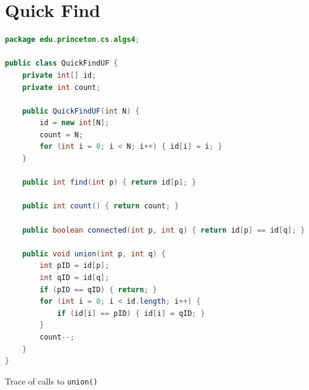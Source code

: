 \documentclass[8pt,a4paper,compress]{beamer}
\begin{document}
\section{Quick Find}
\begin{frame}[fragile]
\pause

\begin{lstlisting}[language=Java,style=focusin]
package edu.princeton.cs.algs4;

public class QuickFindUF {
    private int[] id;
    private int count;

    public QuickFindUF(int N) {
        id = new int[N];
        count = N;
        for (int i = 0; i < N; i++) { id[i] = i; }
    }

    public int find(int p) { return id[p]; }

    public int count() { return count; }
  
    public boolean connected(int p, int q) { return id[p] == id[q]; }

    public void union(int p, int q) {
        int pID = id[p];
        int qID = id[q];
        if (pID == qID) { return; }
        for (int i = 0; i < id.length; i++) {
            if (id[i] == pID) { id[i] = qID; }
        }
        count--;
    }
}
\end{lstlisting}
\end{frame}

\begin{frame}[fragile]
\pause

Trace of calls to \lstinline{union()}

\begin{center}
\end{center}
\end{frame}
\end{document}
